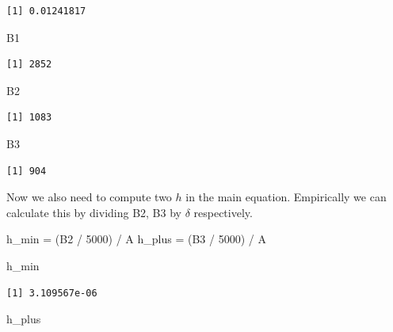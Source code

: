 \documentclass[
  letterpaper,
  DIV=11,
  numbers=noendperiod]{scrartcl}
\newenvironment{Shaded}{\begin{snugshade}}{\end{snugshade}}
\newcommand{\DecValTok}[1]{\textcolor[rgb]{0.68,0.00,0.00}{#1}}
\newcommand{\NormalTok}[1]{\textcolor[rgb]{0.00,0.23,0.31}{#1}}
\newcommand{\OtherTok}[1]{\textcolor[rgb]{0.00,0.23,0.31}{#1}}
\newcommand{\SpecialCharTok}[1]{\textcolor[rgb]{0.37,0.37,0.37}{#1}}
\begin{document}
\begin{verbatim}
[1] 0.01241817
\end{verbatim}

\begin{Shaded}
\begin{Highlighting}[]
\NormalTok{B1}
\end{Highlighting}
\end{Shaded}

\begin{verbatim}
[1] 2852
\end{verbatim}

\begin{Shaded}
\begin{Highlighting}[]
\NormalTok{B2}
\end{Highlighting}
\end{Shaded}

\begin{verbatim}
[1] 1083
\end{verbatim}

\begin{Shaded}
\begin{Highlighting}[]
\NormalTok{B3}
\end{Highlighting}
\end{Shaded}

\begin{verbatim}
[1] 904
\end{verbatim}

Now we also need to compute two \(h\) in the main equation. Empirically
we can calculate this by dividing B2, B3 by \(\delta\) respectively.

\begin{Shaded}
\begin{Highlighting}[]
\NormalTok{h\_min }\OtherTok{=}\NormalTok{ (B2 }\SpecialCharTok{/} \DecValTok{5000}\NormalTok{) }\SpecialCharTok{/}\NormalTok{ A}
\NormalTok{h\_plus }\OtherTok{=}\NormalTok{ (B3 }\SpecialCharTok{/} \DecValTok{5000}\NormalTok{) }\SpecialCharTok{/}\NormalTok{ A }

\NormalTok{h\_min}
\end{Highlighting}
\end{Shaded}

\begin{verbatim}
[1] 3.109567e-06
\end{verbatim}

\begin{Shaded}
\begin{Highlighting}[]
\NormalTok{h\_plus}
\end{Highlighting}
\end{Shaded}
\end{document}

